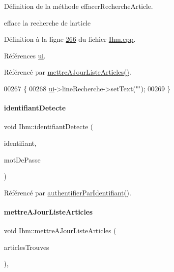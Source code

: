 Définition de la méthode effacer\+Recherche\+Article. 

efface la recherche de l\textquotesingle{}article 

Définition à la ligne \hyperlink{_ihm_8cpp_source_l00266}{266} du fichier \hyperlink{_ihm_8cpp_source}{Ihm.\+cpp}.



Références \hyperlink{_ihm_8h_source_l00099}{ui}.



Référencé par \hyperlink{_ihm_8cpp_source_l00276}{mettre\+A\+Jour\+Liste\+Articles()}.


\begin{DoxyCode}
00267 \{
00268     \hyperlink{class_ihm_a0ac5f47856566ceeeca1720109bf70ea}{ui}->lineRecherche->setText(\textcolor{stringliteral}{""});
00269 \}
\end{DoxyCode}
\mbox{\label{class_ihm_a7cbb2cb835ec643c0a673082d2956405}} 
\paragraph{\texorpdfstring{identifiant\+Detecte}{identifiantDetecte}}
{\footnotesize\ttfamily void Ihm\+::identifiant\+Detecte (\begin{DoxyParamCaption}\item[{Q\+String}]{identifiant,  }\item[{Q\+String}]{mot\+De\+Passe }\end{DoxyParamCaption})\hspace{0.3cm}{\ttfamily [signal]}}



Référencé par \hyperlink{_ihm_8cpp_source_l00139}{authentifier\+Par\+Identifiant()}.

\mbox{\label{class_ihm_a9b30cf664493a0089f95ec8b977a8f1e}} 
\paragraph{\texorpdfstring{mettre\+A\+Jour\+Liste\+Articles}{mettreAJourListeArticles}}
{\footnotesize\ttfamily void Ihm\+::mettre\+A\+Jour\+Liste\+Articles (\begin{DoxyParamCaption}\item[{Q\+Vector$<$ Q\+String\+List $>$}]{articles\+Trouves }\end{DoxyParamCaption})\hspace{0.3cm}{\ttfamily [private]}, {\ttfamily [slot]}}



